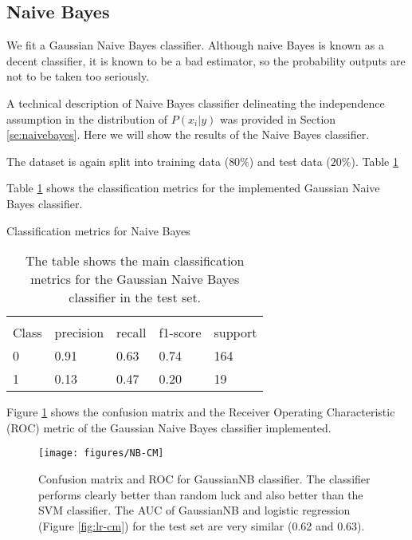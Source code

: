 \documentclass[11pt]{article}
\begin{document}
\subsection{Naive Bayes}
\label{se:resnaivebayes}

We fit a Gaussian Naive Bayes classifier. Although naive Bayes is known as a decent classifier, it is known to be a bad estimator, so the probability outputs are not to be taken too seriously. %

A technical description of Naive Bayes classifier delineating the independence assumption in the distribution of $P(x_i | y)$ was provided in Section \ref{se:naivebayes}. Here we will show the results of the Naive Bayes classifier.

The dataset is again split into training data ($80\%$) and test data ($20\%$). Table \ref{tab:naive}

Table \ref{tab:naive} shows the classification metrics for the implemented Gaussian Naive Bayes classifier.
\begin{table}[H]
\caption{Classification metrics for Naive Bayes} \label{tab:naive} 
\begin{center} 
\begin{tabular}{lllll}
\hline
\multicolumn{1}{c}{} \\
Class & precision & recall & f1-score & support     \\
\hline
0 & 0.91  &    0.63   &   0.74   &    164 \\
1 & 0.13  &    0.47   &   0.20   &    19 \\
\hline
\end{tabular}
\caption{The table shows the main classification metrics for the Gaussian Naive Bayes classifier in the test set.}
\end{center}
\end{table}

Figure \ref{fig:nb-cm} shows the confusion matrix and the Receiver Operating Characteristic (ROC) metric of the Gaussian Naive Bayes classifier implemented.
\begin{figure}[H]
        \centering
        \texttt{[image: figures/NB-CM]}
        \caption{Confusion matrix and ROC for GaussianNB classifier. The classifier performs clearly better than random luck and also better than the SVM classifier. The AUC of GaussianNB and logistic regression (Figure \ref{fig:lr-cm}) for the test set  are very similar (0.62 and 0.63).}
\label{fig:nb-cm}
\end{figure}
\end{document}
